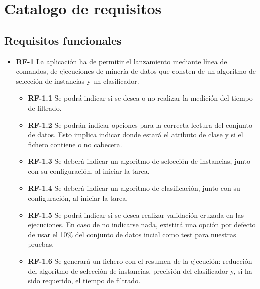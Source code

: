 \section{Catalogo de requisitos}

\subsection{Requisitos funcionales}

\begin{itemize}

\item \textbf{RF-1} La aplicación ha de permitir el lanzamiento mediante línea de comandos, de ejecuciones de minería de datos que consten de un algoritmo de selección de instancias y un clasificador.
	\begin{itemize}
		\item \textbf{RF-1.1} Se podrá indicar si se desea o no realizar la medición del tiempo de filtrado.
		\item \textbf{RF-1.2} Se podrán indicar opciones para la correcta lectura del conjunto de datos. Esto implica indicar donde estará el atributo de clase y si el fichero contiene o no cabecera.
		\item \textbf{RF-1.3} Se deberá indicar un algoritmo de selección de instancias, junto con su configuración, al iniciar la tarea.
		\item \textbf{RF-1.4} Se deberá indicar un algoritmo de clasificación, junto con su configuración, al iniciar la tarea.
		\item \textbf{RF-1.5} Se podrá indicar si se desea realizar validación cruzada en las ejecuciones. En caso de no indicarse nada, existirá una opción por defecto de usar el 10\% del conjunto de datos incial como test para nuestras pruebas.
		\item \textbf{RF-1.6} Se generará un fichero con el resumen de la ejecución: reducción del algoritmo de selección de instancias, precisión del clasificador y, si ha sido requerido, el tiempo de filtrado.
	\end{itemize}


\end{itemize}
